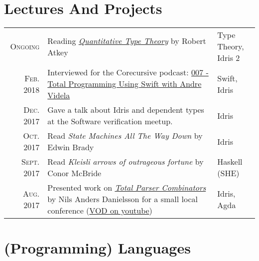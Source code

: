 \documentclass[a4paper,10pt]{article} %
\begin{document}
\section{Lectures And Projects}
\renewcommand{\arraystretch}{1.5}
\begin{tabular}{rp{10cm}|l}
\textsc{Ongoing} & Reading \href{https://bentnib.org/quantitative-type-theory.html}{\emph{Quantitative Type Theory}} by Robert Atkey & \makecell[cl]{Type Theory, \\Idris 2}\\
\textsc{Feb.} 2018 & Interviewed for the Corecursive podcast: \href{https://corecursive.com/007-total-programming-using-swift-with-andre-videla}{007 - Total Programming Using Swift with Andre Videla} & Swift, Idris\\
\textsc{Dec.} 2017 & Gave a talk about Idris and dependent types at the Software verification meetup. & Idris\\
\textsc{Oct.} 2017 & Read \emph{State Machines All The Way Down} by Edwin Brady & Idris\\
\textsc{Sept.} 2017 & Read \emph{Kleisli arrows of outrageous fortune} by Conor McBride & Haskell (SHE)\\
\textsc{Aug.} 2017 & Presented work on \href{http://www.cse.chalmers.se/~nad/publications/danielsson-parser-combinators.html}{\emph{Total Parser Combinators}} by Nils Anders Danielsson for a small local conference (\href{https://www.youtube.com/watch?v=DzKVm6ApKFI}{VOD on youtube})& Idris, Agda\\

\end{tabular}
\renewcommand{\arraystretch}{1.2}



\section{(Programming) Languages}
\end{document}
